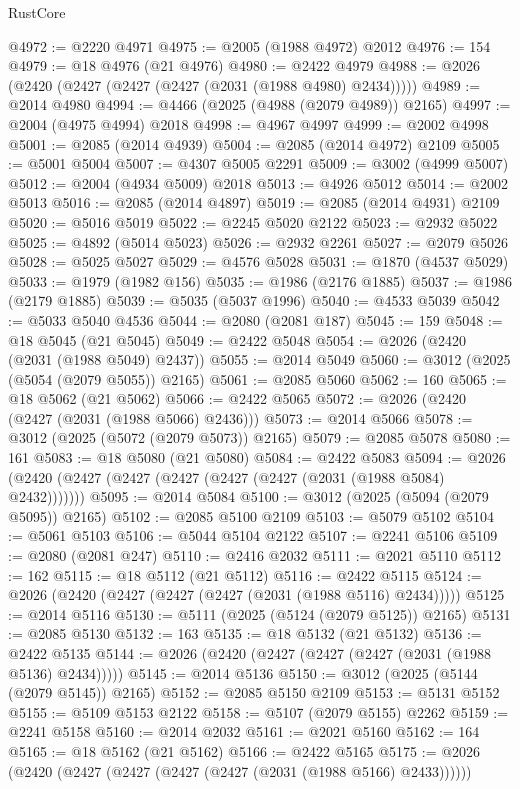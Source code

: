 \begin{lexlean}{RustCore}
\begin{coremodule}
@4972 := @2220 @4971
@4975 := @2005 (@1988 @4972) @2012
@4976 := 154
@4979 := @18 @4976 (@21 @4976)
@4980 := @2422 @4979
@4988 := @2026 (@2420 (@2427 (@2427 (@2427 (@2031 (@1988 @4980) @2434)))))
@4989 := @2014 @4980
@4994 := @4466 (@2025 (@4988 (@2079 @4989)) @2165)
@4997 := @2004 (@4975 @4994) @2018
@4998 := @4967 @4997
@4999 := @2002 @4998
@5001 := @2085 (@2014 @4939)
@5004 := @2085 (@2014 @4972) @2109
@5005 := @5001 @5004
@5007 := @4307 @5005 @2291
@5009 := @3002 (@4999 @5007)
@5012 := @2004 (@4934 @5009) @2018
@5013 := @4926 @5012
@5014 := @2002 @5013
@5016 := @2085 (@2014 @4897)
@5019 := @2085 (@2014 @4931) @2109
@5020 := @5016 @5019
@5022 := @2245 @5020 @2122
@5023 := @2932 @5022
@5025 := @4892 (@5014 @5023)
@5026 := @2932 @2261
@5027 := @2079 @5026
@5028 := @5025 @5027
@5029 := @4576 @5028
@5031 := @1870 (@4537 @5029)
@5033 := @1979 (@1982 @156)
@5035 := @1986 (@2176 @1885)
@5037 := @1986 (@2179 @1885)
@5039 := @5035 (@5037 @1996)
@5040 := @4533 @5039
@5042 := @5033 @5040 @4536
@5044 := @2080 (@2081 @187)
@5045 := 159
@5048 := @18 @5045 (@21 @5045)
@5049 := @2422 @5048
@5054 := @2026 (@2420 (@2031 (@1988 @5049) @2437))
@5055 := @2014 @5049
@5060 := @3012 (@2025 (@5054 (@2079 @5055)) @2165)
@5061 := @2085 @5060
@5062 := 160
@5065 := @18 @5062 (@21 @5062)
@5066 := @2422 @5065
@5072 := @2026 (@2420 (@2427 (@2031 (@1988 @5066) @2436)))
@5073 := @2014 @5066
@5078 := @3012 (@2025 (@5072 (@2079 @5073)) @2165)
@5079 := @2085 @5078
@5080 := 161
@5083 := @18 @5080 (@21 @5080)
@5084 := @2422 @5083
@5094 := @2026 (@2420 (@2427 (@2427 (@2427 (@2427 (@2427 (@2031 (@1988 @5084) @2432)))))))
@5095 := @2014 @5084
@5100 := @3012 (@2025 (@5094 (@2079 @5095)) @2165)
@5102 := @2085 @5100 @2109
@5103 := @5079 @5102
@5104 := @5061 @5103
@5106 := @5044 @5104 @2122
@5107 := @2241 @5106
@5109 := @2080 (@2081 @247)
@5110 := @2416 @2032
@5111 := @2021 @5110
@5112 := 162
@5115 := @18 @5112 (@21 @5112)
@5116 := @2422 @5115
@5124 := @2026 (@2420 (@2427 (@2427 (@2427 (@2031 (@1988 @5116) @2434)))))
@5125 := @2014 @5116
@5130 := @5111 (@2025 (@5124 (@2079 @5125)) @2165)
@5131 := @2085 @5130
@5132 := 163
@5135 := @18 @5132 (@21 @5132)
@5136 := @2422 @5135
@5144 := @2026 (@2420 (@2427 (@2427 (@2427 (@2031 (@1988 @5136) @2434)))))
@5145 := @2014 @5136
@5150 := @3012 (@2025 (@5144 (@2079 @5145)) @2165)
@5152 := @2085 @5150 @2109
@5153 := @5131 @5152
@5155 := @5109 @5153 @2122
@5158 := @5107 (@2079 @5155) @2262
@5159 := @2241 @5158
@5160 := @2014 @2032
@5161 := @2021 @5160
@5162 := 164
@5165 := @18 @5162 (@21 @5162)
@5166 := @2422 @5165
@5175 := @2026 (@2420 (@2427 (@2427 (@2427 (@2427 (@2031 (@1988 @5166) @2433))))))

\end{coremodule}
\end{lexlean}
